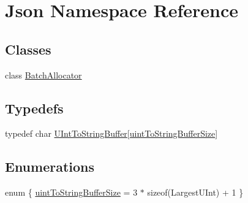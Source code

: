\hypertarget{namespace_json}{}\section{Json Namespace Reference}
\label{namespace_json}
\subsection*{Classes}
\begin{DoxyCompactItemize}
\item 
class \mbox{\hyperlink{class_json_1_1_batch_allocator}{Batch\+Allocator}}
\end{DoxyCompactItemize}
\subsection*{Typedefs}
\begin{DoxyCompactItemize}
\item 
typedef char \mbox{\hyperlink{namespace_json_a602bcf69c2042fb61c3b243cb16f04ca}{U\+Int\+To\+String\+Buffer}}\mbox{[}\mbox{\hyperlink{namespace_json_a0c5f614b019f20b4598dcaec09d9e820ae4f2008c7919f20d81286121d1374424}{uint\+To\+String\+Buffer\+Size}}\mbox{]}
\end{DoxyCompactItemize}
\subsection*{Enumerations}
\begin{DoxyCompactItemize}
\item 
enum \{ \mbox{\hyperlink{namespace_json_a0c5f614b019f20b4598dcaec09d9e820ae4f2008c7919f20d81286121d1374424}{uint\+To\+String\+Buffer\+Size}} = 3 $\ast$ sizeof(Largest\+U\+Int) + 1
 \}
\end{DoxyCompactItemize}

